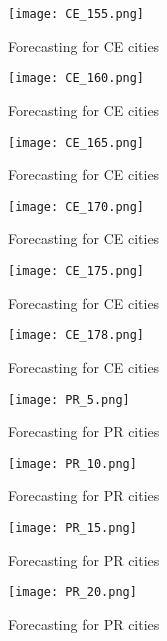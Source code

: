 \begin{figure}[!ht] 
 \centering 
 \texttt{[image: CE\_155.png]} 
 \caption{Forecasting for CE cities } 
 \label{fig:CE_155} 
 \end{figure} 
 
 \begin{figure}[!ht] 
 \centering 
 \texttt{[image: CE\_160.png]} 
 \caption{Forecasting for CE cities } 
 \label{fig:CE_160} 
 \end{figure} 
 
 \begin{figure}[!ht] 
 \centering 
 \texttt{[image: CE\_165.png]} 
 \caption{Forecasting for CE cities } 
 \label{fig:CE_165} 
 \end{figure} 
 
 \begin{figure}[!ht] 
 \centering 
 \texttt{[image: CE\_170.png]} 
 \caption{Forecasting for CE cities } 
 \label{fig:CE_170} 
 \end{figure} 
 
 \begin{figure}[!ht] 
 \centering 
 \texttt{[image: CE\_175.png]} 
 \caption{Forecasting for CE cities } 
 \label{fig:CE_175} 
 \end{figure} 
 
 \begin{figure}[!ht] 
 \centering 
 \texttt{[image: CE\_178.png]} 
 \caption{Forecasting for CE cities } 
 \label{fig:CE_178} 
 \end{figure} 
 
 \begin{figure}[!ht] 
 \centering 
 \texttt{[image: PR\_5.png]} 
 \caption{Forecasting for PR cities } 
 \label{fig:PR_5} 
 \end{figure} 
 
 \begin{figure}[!ht] 
 \centering 
 \texttt{[image: PR\_10.png]} 
 \caption{Forecasting for PR cities } 
 \label{fig:PR_10} 
 \end{figure} 
 
 \begin{figure}[!ht] 
 \centering 
 \texttt{[image: PR\_15.png]} 
 \caption{Forecasting for PR cities } 
 \label{fig:PR_15} 
 \end{figure} 
 
 \begin{figure}[!ht] 
 \centering 
 \texttt{[image: PR\_20.png]} 
 \caption{Forecasting for PR cities } 
 \label{fig:PR_20} 
 \end{figure} 
 
